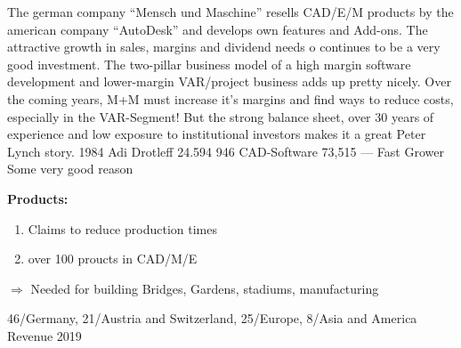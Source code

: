 \documentclass{company_analysis}
\begin{document}


\story
    {The german company \enquote{Mensch und Maschine} resells CAD/E/M
    products by the american company \enquote{AutoDesk} and develops
    own features and Add-ons. The attractive growth in sales, margins
    and dividend needs o continues to be a very good investment. The
    two-pillar business model of a high margin software development and
    lower-margin VAR/project business adds up pretty nicely. Over the
    coming years, M+M must increase it's margins and find ways to reduce
    costs, especially in the VAR-Segment! But the strong balance sheet,
    over 30 years of experience and low exposure to institutional investors
    makes it a great Peter Lynch story.}
\infosection
    {1984}
    {Adi Drotleff}
    {24.594}
    {946}
    {CAD-Software}
    {73,515}
    {---}
    {Fast Grower}
    {Some very good reason}



\begin{minipage}{.6\linewidth}
    \faArchive\space\textbf{Products:}
    \begin{enumerate}
        \item Claims to reduce production times
        \item over 100 proucts in CAD/M/E
    \end{enumerate}
    $\Rightarrow$ Needed for building Bridges, Gardens, stadiums, manufacturing
\end{minipage}
        \begin{piechart}
            {46/Germany, 21/Austria and Switzerland, 25/Europe, 8/Asia and America}
            {Revenue 2019}
        \end{piechart}

\end{document}
